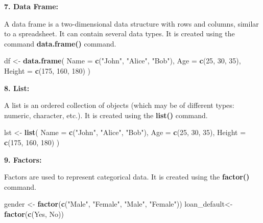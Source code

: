 \documentclass[
]{book}
\newenvironment{Shaded}{\begin{snugshade}}{\end{snugshade}}
\newcommand{\AttributeTok}[1]{\textcolor[rgb]{0.13,0.29,0.53}{#1}}
\newcommand{\DecValTok}[1]{\textcolor[rgb]{0.00,0.00,0.81}{#1}}
\newcommand{\FunctionTok}[1]{\textcolor[rgb]{0.13,0.29,0.53}{\textbf{#1}}}
\newcommand{\NormalTok}[1]{#1}
\newcommand{\OtherTok}[1]{\textcolor[rgb]{0.56,0.35,0.01}{#1}}
\newcommand{\StringTok}[1]{\textcolor[rgb]{0.31,0.60,0.02}{#1}}
\begin{document}
\textbf{7. Data Frame:}

A data frame is a two-dimensional data structure with rows and columns, similar to a spreadsheet. It can contain several data types. It is created using the command \textbf{data.frame()} command.

\begin{Shaded}
\begin{Highlighting}[]
\NormalTok{df }\OtherTok{\textless{}{-}} \FunctionTok{data.frame}\NormalTok{(}
  \AttributeTok{Name =} \FunctionTok{c}\NormalTok{(}\StringTok{"John"}\NormalTok{, }\StringTok{"Alice"}\NormalTok{, }\StringTok{"Bob"}\NormalTok{),}
  \AttributeTok{Age =} \FunctionTok{c}\NormalTok{(}\DecValTok{25}\NormalTok{, }\DecValTok{30}\NormalTok{, }\DecValTok{35}\NormalTok{),}
  \AttributeTok{Height =} \FunctionTok{c}\NormalTok{(}\DecValTok{175}\NormalTok{, }\DecValTok{160}\NormalTok{, }\DecValTok{180}\NormalTok{)}
\NormalTok{)}
\end{Highlighting}
\end{Shaded}

\textbf{8. List:}

A list is an ordered collection of objects (which may be of different types: numeric, character, etc.). It is created using the \textbf{list()} command.

\begin{Shaded}
\begin{Highlighting}[]
\NormalTok{lst }\OtherTok{\textless{}{-}} \FunctionTok{list}\NormalTok{(}
  \AttributeTok{Name =} \FunctionTok{c}\NormalTok{(}\StringTok{"John"}\NormalTok{, }\StringTok{"Alice"}\NormalTok{, }\StringTok{"Bob"}\NormalTok{),}
  \AttributeTok{Age =} \FunctionTok{c}\NormalTok{(}\DecValTok{25}\NormalTok{, }\DecValTok{30}\NormalTok{, }\DecValTok{35}\NormalTok{),}
  \AttributeTok{Height =} \FunctionTok{c}\NormalTok{(}\DecValTok{175}\NormalTok{, }\DecValTok{160}\NormalTok{, }\DecValTok{180}\NormalTok{)}
\NormalTok{)}
\end{Highlighting}
\end{Shaded}

\textbf{9. Factors:}

Factors are used to represent categorical data. It is created using the \textbf{factor()} command.

\begin{Shaded}
\begin{Highlighting}[]
\NormalTok{gender }\OtherTok{\textless{}{-}} \FunctionTok{factor}\NormalTok{(}\FunctionTok{c}\NormalTok{(}\StringTok{"Male"}\NormalTok{, }\StringTok{"Female"}\NormalTok{, }\StringTok{"Male"}\NormalTok{, }\StringTok{"Female"}\NormalTok{))}
\NormalTok{loan\_default}\OtherTok{\textless{}{-}}\FunctionTok{factor}\NormalTok{(}\FunctionTok{c}\NormalTok{(}\StringTok{\textquotesingle{}Yes\textquotesingle{}}\NormalTok{, }\StringTok{\textquotesingle{}No\textquotesingle{}}\NormalTok{))}
\end{Highlighting}
\end{Shaded}
\end{document}
